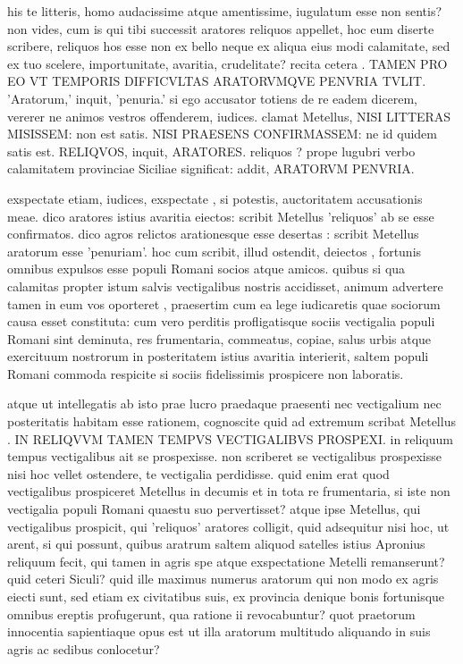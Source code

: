  his te litteris, homo audacissime atque amentissime, iugulatum esse non sentis? non vides, cum is qui tibi successit aratores reliquos appellet, hoc eum diserte scribere, reliquos hos esse non ex bello neque ex aliqua eius modi calamitate, sed ex tuo scelere, importunitate, avaritia, crudelitate? recita cetera . TAMEN PRO EO VT TEMPORIS DIFFICVLTAS ARATORVMQVE PENVRIA TVLIT. 'Aratorum,' inquit, 'penuria.' si ego accusator totiens de re eadem dicerem, vererer ne animos vestros offenderem, iudices. clamat Metellus, NISI LITTERAS MISISSEM: non est satis. NISI PRAESENS CONFIRMASSEM: ne id quidem satis est. RELIQVOS, inquit, ARATORES. reliquos ? prope lugubri verbo calamitatem provinciae Siciliae significat: addit, ARATORVM PENVRIA.

 exspectate etiam, iudices, exspectate , si potestis, auctoritatem accusationis meae. dico aratores istius avaritia eiectos: scribit Metellus 'reliquos' ab se esse confirmatos. dico agros relictos arationesque esse desertas : scribit Metellus aratorum esse 'penuriam'. hoc cum scribit, illud ostendit, deiectos , fortunis omnibus expulsos esse populi Romani socios atque amicos. quibus si qua calamitas propter istum salvis vectigalibus nostris accidisset, animum advertere tamen in eum vos oporteret , praesertim cum ea lege iudicaretis quae sociorum causa esset constituta: cum vero perditis profligatisque sociis vectigalia populi Romani sint deminuta, res frumentaria, commeatus, copiae, salus urbis atque exercituum nostrorum in posteritatem istius avaritia interierit, saltem populi Romani commoda respicite si sociis fidelissimis prospicere non laboratis.

 atque ut intellegatis ab isto prae lucro praedaque praesenti nec vectigalium nec posteritatis habitam esse rationem, cognoscite quid ad extremum scribat Metellus . IN RELIQVVM TAMEN TEMPVS VECTIGALIBVS PROSPEXI. in reliquum tempus vectigalibus ait se prospexisse. non scriberet se vectigalibus prospexisse nisi hoc vellet ostendere, te vectigalia perdidisse. quid enim erat quod vectigalibus prospiceret Metellus in decumis et in tota re frumentaria, si iste non vectigalia populi Romani quaestu suo pervertisset? atque ipse Metellus, qui vectigalibus prospicit, qui 'reliquos' aratores colligit, quid adsequitur nisi hoc, ut arent, si qui possunt, quibus aratrum saltem aliquod satelles istius Apronius reliquum fecit, qui tamen in agris spe atque exspectatione Metelli remanserunt? quid ceteri Siculi? quid ille maximus numerus aratorum qui non modo ex agris eiecti sunt, sed etiam ex civitatibus suis, ex provincia denique bonis fortunisque omnibus ereptis profugerunt, qua ratione ii revocabuntur? quot praetorum innocentia sapientiaque opus est ut illa aratorum multitudo aliquando in suis agris ac sedibus conlocetur?

